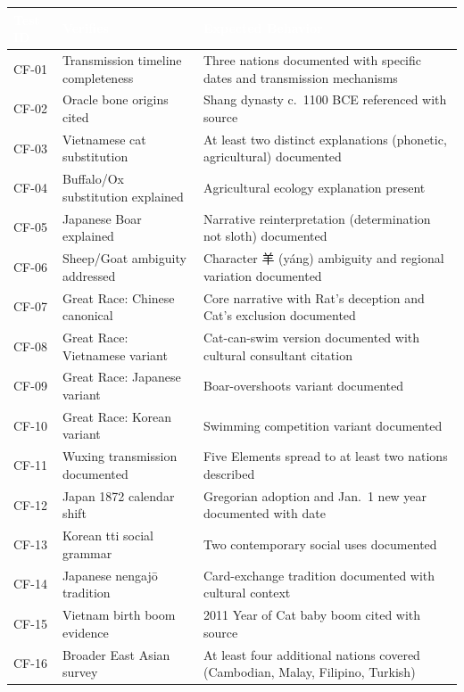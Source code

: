 \documentclass[11pt,letterpaper]{article}
\newcommand{\tableheader}[1]{\textbf{\sffamily\textcolor{white}{#1}}}
\begin{document}
\begin{center}
\begin{tabularx}{\textwidth}{C{1.5cm}L{3.5cm}X}
\toprule
{}
\tableheader{Test ID} & \tableheader{Verifies} & \tableheader{Expected Behavior} \\
\midrule
CF-01 & Transmission timeline completeness & Three nations documented with specific dates and transmission mechanisms \\
CF-02 & Oracle bone origins cited & Shang dynasty c.\ 1100 BCE referenced with source \\
CF-03 & Vietnamese cat substitution & At least two distinct explanations (phonetic, agricultural) documented \\
CF-04 & Buffalo/Ox substitution explained & Agricultural ecology explanation present \\
CF-05 & Japanese Boar explained & Narrative reinterpretation (determination not sloth) documented \\
CF-06 & Sheep/Goat ambiguity addressed & Character 羊 (y\'{a}ng) ambiguity and regional variation documented \\
CF-07 & Great Race: Chinese canonical & Core narrative with Rat's deception and Cat's exclusion documented \\
CF-08 & Great Race: Vietnamese variant & Cat-can-swim version documented with cultural consultant citation \\
CF-09 & Great Race: Japanese variant & Boar-overshoots variant documented \\
CF-10 & Great Race: Korean variant & Swimming competition variant documented \\
CF-11 & Wuxing transmission documented & Five Elements spread to at least two nations described \\
CF-12 & Japan 1872 calendar shift & Gregorian adoption and Jan.\ 1 new year documented with date \\
CF-13 & Korean tti social grammar & Two contemporary social uses documented \\
CF-14 & Japanese nengaj\={o} tradition & Card-exchange tradition documented with cultural context \\
CF-15 & Vietnam birth boom evidence & 2011 Year of Cat baby boom cited with source \\
CF-16 & Broader East Asian survey & At least four additional nations covered (Cambodian, Malay, Filipino, Turkish) \\
\bottomrule
\end{tabularx}
\end{center}
\end{document}
